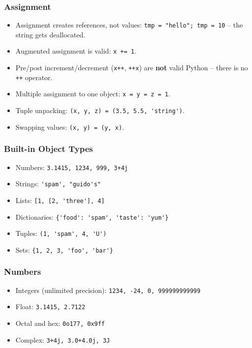 \begin{frame}[fragile]  \frametitle{Assignment}
	\begin{itemize}
	\item Assignment creates references, not values: \lstinline{tmp = "hello"; tmp = 10} -- the string gets deallocated.
	\item Augmented assignment is valid: \lstinline{x += 1}.
	\item Pre/post increment/decrement (\lstinline{x++}, \lstinline{++x}) are \textbf{not} valid Python -- there is no \texttt{++} operator.
	\item Multiple assignment to one object: \lstinline{x = y = z = 1}.
	\item Tuple unpacking: \lstinline{(x, y, z) = (3.5, 5.5, 'string')}.
	\item Swapping values: \lstinline{(x, y) = (y, x)}.
	\end{itemize}
\end{frame}

\begin{frame}[fragile]\frametitle{Built-in Object Types}
	\begin{itemize}
	\item Numbers: \lstinline{3.1415, 1234, 999, 3+4j}
	\item Strings: \lstinline{'spam', "guido's"}
	\item Lists: \lstinline{[1, [2, 'three'], 4]}
	\item Dictionaries: \lstinline|{'food': 'spam', 'taste': 'yum'}|
	\item Tuples: \lstinline{(1, 'spam', 4, 'U')}
	\item Sets: \lstinline|{1, 2, 3, 'foo', 'bar'}|
	\end{itemize}
\end{frame}

\begin{frame}[fragile]\frametitle{Numbers}
	\begin{itemize}
	\item Integers (unlimited precision): \lstinline{1234, -24, 0, 999999999999}
	\item Float: \lstinline{3.1415, 2.7122}
	\item Octal and hex: \lstinline{0o177, 0x9ff}
	\item Complex: \lstinline{3+4j, 3.0+4.0j, 3J}
	\end{itemize}
\end{frame}

